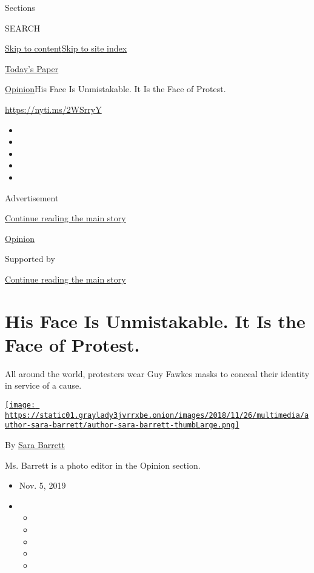 Sections

SEARCH

\protect\hyperlink{site-content}{Skip to
content}\protect\hyperlink{site-index}{Skip to site index}

\href{https://myaccount.nytimes3xbfgragh.onion/auth/login?response_type=cookie\&client_id=vi}{}

\href{https://www.nytimes3xbfgragh.onion/section/todayspaper}{Today's
Paper}

\href{/section/opinion}{Opinion}\textbar{}His Face Is Unmistakable. It
Is the Face of Protest.

\href{https://nyti.ms/2WSrryY}{https://nyti.ms/2WSrryY}

\begin{itemize}
\item
\item
\item
\item
\item
\end{itemize}

Advertisement

\protect\hyperlink{after-top}{Continue reading the main story}

\href{/section/opinion}{Opinion}

Supported by

\protect\hyperlink{after-sponsor}{Continue reading the main story}

\hypertarget{his-face-is-unmistakable-it-is-the-face-of-protest}{%
\section{His Face Is Unmistakable. It Is the Face of
Protest.}\label{his-face-is-unmistakable-it-is-the-face-of-protest}}

All around the world, protesters wear Guy Fawkes masks to conceal their
identity in service of a cause.

\href{https://www.nytimes3xbfgragh.onion/by/sara-barrett}{\texttt{[image: https://static01.graylady3jvrrxbe.onion/images/2018/11/26/multimedia/author-sara-barrett/author-sara-barrett-thumbLarge.png]}}

By \href{https://www.nytimes3xbfgragh.onion/by/sara-barrett}{Sara
Barrett}

Ms. Barrett is a photo editor in the Opinion section.

\begin{itemize}
\item
  Nov. 5, 2019
\item
  \begin{itemize}
  \item
  \item
  \item
  \item
  \item
  \end{itemize}
\end{itemize}

